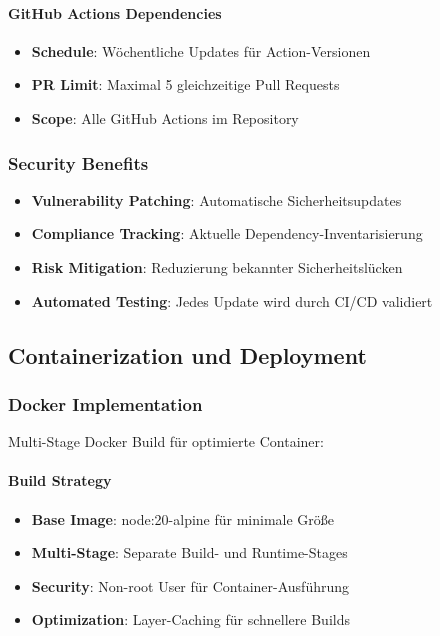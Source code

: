 \paragraph{GitHub Actions Dependencies}
\begin{itemize}
    \item \textbf{Schedule}: Wöchentliche Updates für Action-Versionen
    \item \textbf{PR Limit}: Maximal 5 gleichzeitige Pull Requests
    \item \textbf{Scope}: Alle GitHub Actions im Repository
\end{itemize}

\subsubsection{Security Benefits}
\begin{itemize}
    \item \textbf{Vulnerability Patching}: Automatische Sicherheitsupdates
    \item \textbf{Compliance Tracking}: Aktuelle Dependency-Inventarisierung
    \item \textbf{Risk Mitigation}: Reduzierung bekannter Sicherheitslücken
    \item \textbf{Automated Testing}: Jedes Update wird durch CI/CD validiert
\end{itemize}

\subsection{Containerization und Deployment}

\subsubsection{Docker Implementation}
Multi-Stage Docker Build für optimierte Container:

\paragraph{Build Strategy}
\begin{itemize}
    \item \textbf{Base Image}: node:20-alpine für minimale Größe
    \item \textbf{Multi-Stage}: Separate Build- und Runtime-Stages
    \item \textbf{Security}: Non-root User für Container-Ausführung
    \item \textbf{Optimization}: Layer-Caching für schnellere Builds
\end{itemize}

